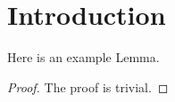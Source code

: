\section{Introduction}


\begin{lemma}
Here is an example Lemma.
\end{lemma}
\begin{proof}
The proof is trivial.
\end{proof}